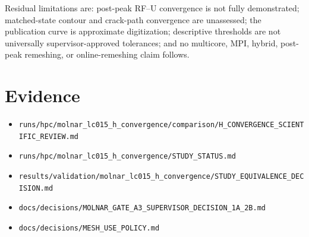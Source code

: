 \documentclass[11pt,a4paper]{article}
\begin{document}
Residual limitations are: post-peak RF--U convergence is not fully
demonstrated; matched-state contour and crack-path convergence are unassessed;
the publication curve is approximate digitization; descriptive thresholds are
not universally supervisor-approved tolerances; and no multicore, MPI, hybrid,
post-peak remeshing, or online-remeshing claim follows.

\section*{Evidence}

\begin{itemize}
\item \texttt{runs/hpc/molnar\_lc015\_h\_convergence/comparison/H\_CONVERGENCE\_SCIENTIFIC\_REVIEW.md}
\item \texttt{runs/hpc/molnar\_lc015\_h\_convergence/STUDY\_STATUS.md}
\item \texttt{results/validation/molnar\_lc015\_h\_convergence/STUDY\_EQUIVALENCE\_DECISION.md}
\item \texttt{docs/decisions/MOLNAR\_GATE\_A3\_SUPERVISOR\_DECISION\_1A\_2B.md}
\item \texttt{docs/decisions/MESH\_USE\_POLICY.md}
\end{itemize}
\end{document}
